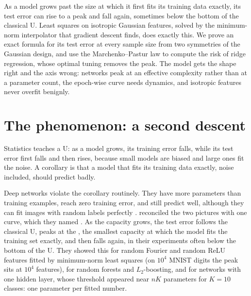 \begin{refsection}

\begin{chaptersummary}
As a model grows past the size at which it first fits its training data exactly, its test error can rise to a peak and fall again, sometimes below the bottom of the classical U. Least squares on isotropic Gaussian features, solved by the minimum-norm interpolator that gradient descent finds, does exactly this. We prove an exact formula for its test error at every sample size from two symmetries of the Gaussian design, and use the Marchenko--Pastur law to compute the risk of ridge regression, whose optimal tuning removes the peak. The model gets the shape right and the axis wrong: networks peak at an effective complexity rather than at a parameter count, the epoch-wise curve needs dynamics, and isotropic features never overfit benignly.
\end{chaptersummary}

\section{The phenomenon: a second descent}\label{sec:doubledescent:phenomenon}

Statistics teaches a U: as a model grows, its training error falls, while its test error first falls and then rises, because small models are biased and large ones fit the noise. A corollary is that a model that fits its training data exactly, noise included, should predict badly.

Deep networks violate the corollary routinely. They have more parameters than training examples, reach zero training error, and still predict well, although they can fit images with random labels perfectly \parencite{ZhangEtAl2017}. \Textcite{BelkinEtAl2019} reconciled the two pictures with one curve, which they named . As the capacity grows, the test error follows the classical U, peaks at the , the smallest capacity at which the model fits the training set exactly, and then falls again, in their experiments often below the bottom of the U. They showed this for random Fourier and random ReLU features fitted by minimum-norm least squares (on $10^4$ MNIST digits the peak sits at $10^4$ features), for random forests and $L_2$-boosting, and for networks with one hidden layer, whose threshold appeared near $nK$ parameters for $K=10$ classes: one parameter per fitted number.


\end{refsection}
